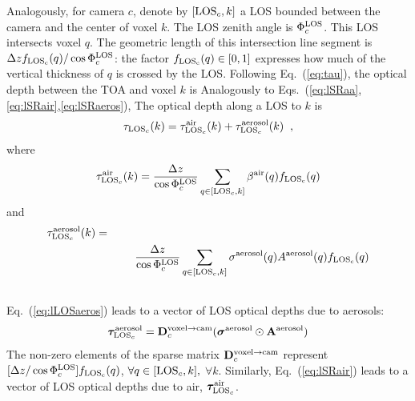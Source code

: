 \documentclass[10pt,twocolumn,letterpaper]{article}
\newcommand{\vect}[1]{\bm{#1}}
\begin{document}
Analogously, for camera $c$, denote by $[{\rm LOS}_c,k]$ 
a LOS bounded between the camera and the center of voxel $k$. The LOS zenith angle is $\Phi^{\rm LOS}_c$.
This LOS intersects voxel $q$. The geometric length of this intersection
line segment is $\Delta z f_{\rm LOS_c}(q)/\cos\Phi^{\rm LOS}_c$: the factor
$f_{\rm LOS_c}(q)\in [0,1]$ expresses how much of the vertical thickness of $q$ is crossed by the LOS.
Following Eq.~(\ref{eq:tau}), the optical depth between the TOA and voxel $k$ is
Analogously to Eqs.~(\ref{eq:lSRaa},\ref{eq:lSRair},\ref{eq:lSRaeros}),
The optical depth %
along a LOS to $k$ is
\begin{equation}
  \tau_{{\rm LOS}_c}(k)=
   \tau_{{\rm LOS}_c}^{\rm air}(k) +  \tau_{{\rm LOS}_c}^{\rm aerosol}(k)
  \;\;,
  \label{eq:lLOSaero}
\end{equation}
where
\begin{equation}
  \tau_{{\rm LOS}_c}^{\rm air}(k)=\frac{\Delta z}{\cos\Phi^{\rm LOS}_c}
     \sum_{q \in[{\rm LOS}_c,k]}
     \beta^{\rm air}(q)  f_{\rm LOS_c}(q)
  \label{eq:lLOSaero}
\end{equation}
and
\begin{eqnarray}
  \tau_{{\rm LOS}_c}^{\rm aerosol}(k)=
  ~~~~~~~~~~~~~~~~~~~~~~~~~~~~~~~~~~~~~
  ~~~~~~~~~~~~~~~~~~~~~~~~~~~~~~~~~\nonumber
  \\  
    \frac{\Delta z}{\cos\Phi^{\rm LOS}_c}
     \sum_{q \in[{\rm LOS}_c,k]}
     \sigma^{\rm aerosol}(q) A^{\rm aerosol}(q) f_{\rm LOS_c}(q)
     \nonumber \\ \hspace{-0.5cm}
  \label{eq:lLOSaeros}
\end{eqnarray}
Eq.~(\ref{eq:lLOSaeros}) leads to a vector of LOS optical depths due to aerosols:
\begin{equation}
  \vect{\tau}_{{\rm LOS}_c}^{\rm aerosol}=
  {\bf D}^{\mathrm{voxel \rightarrow cam}}_c
     (\vect{\sigma}^{\rm aerosol} \odot {\bf A}^{\rm aerosol})
  \label{eq:tauLOSvec1}
\end{equation}
The non-zero elements of the sparse matrix ${\bf D}^{\mathrm{voxel \rightarrow cam}}_c$
represent $[\Delta z/\cos\Phi^{\rm LOS}_c]f_{\rm LOS_c}(q)$, 
\mbox{$\forall q \in[{\rm LOS}_c,k],$} $\forall k$.
Similarly, Eq.~(\ref{eq:lSRair}) leads to a vector of LOS optical depths due to air,
$\vect{\tau}_{{\rm LOS}_c}^{\rm air}$.
\end{document}
